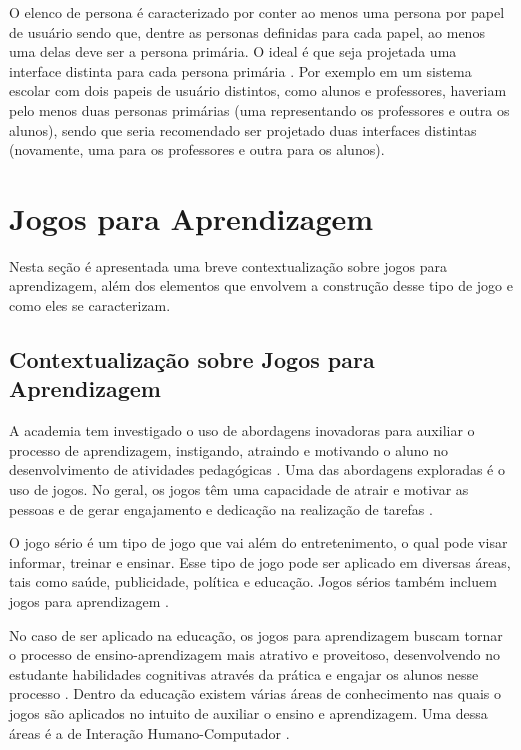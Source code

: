 O elenco de persona é caracterizado por conter ao menos uma persona por papel de usuário sendo que, dentre as personas definidas para cada papel, ao menos uma delas deve ser a persona primária. O ideal é que seja projetada uma interface distinta para cada persona primária \cite[p. 155]{BarbosaEtAl2021}. Por exemplo em um sistema escolar com dois papeis de usuário distintos, como alunos e professores, haveriam pelo menos duas personas primárias (uma representando os professores e outra os alunos), sendo que seria recomendado ser projetado duas interfaces distintas (novamente, uma para os professores e outra para os alunos).

\section{Jogos para Aprendizagem}
\label{sec:jogos-aprend}

Nesta seção é apresentada uma breve contextualização sobre jogos para aprendizagem, além dos elementos que envolvem a construção desse tipo de jogo e como eles se caracterizam. 
\subsection{Contextualização sobre Jogos para Aprendizagem}

A academia tem investigado o uso de abordagens inovadoras para auxiliar o processo de aprendizagem, instigando, atraindo e motivando o aluno no desenvolvimento de atividades pedagógicas \cite{battistella, brito, Sales2020}. Uma das abordagens exploradas é o uso de jogos. No geral, os jogos têm uma capacidade de atrair e motivar as pessoas e de gerar engajamento e dedicação na realização de tarefas \cite{Vianna_Vianna_Medina_Tanaka_Krug_2013}. 

O jogo sério é um tipo de jogo que vai além do entretenimento, o qual pode visar informar, treinar e ensinar. Esse tipo de jogo pode ser aplicado em diversas áreas, tais como saúde, publicidade, política e educação. Jogos sérios também incluem jogos para aprendizagem \cite{Becker_2021}.

No caso de ser aplicado na educação, os jogos para aprendizagem buscam tornar o processo de ensino-aprendizagem mais atrativo e proveitoso, desenvolvendo no estudante habilidades cognitivas através da prática e engajar os alunos nesse processo \cite{sommariva, queiroz, darin}. Dentro da educação existem várias áreas de conhecimento nas quais o jogos são aplicados no intuito de auxiliar o ensino e aprendizagem. Uma dessa áreas é a de Interação Humano-Computador \cite{Sales2020, Sales2020UsoTDS}. 

